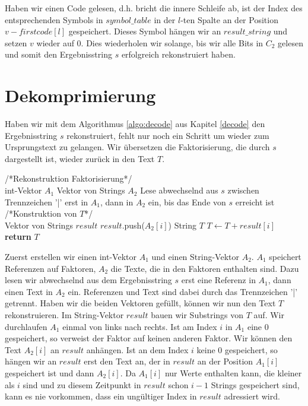 \documentclass[a4paper,11pt]{scrartcl}%
\theoremstyle{change}
\theoremstyle{nonumberplain}
\theoremstyle{change}
\theoremstyle{nonumberplain}
\theoremstyle{change}
\theoremstyle{nonumberplain}
\begin{document}
Haben wir einen Code gelesen, d.h. bricht die innere Schleife ab, ist der Index des entsprechenden Symbols in $symbol\_table$ in der $l$-ten Spalte an der Position $v - firstcode[l]$ gespeichert. Dieses Symbol hängen wir an $result\_string$ und setzen $v$ wieder auf 0. Dies wiederholen wir solange, bis wir alle Bits in $C_2$ gelesen und somit den Ergebnisstring $s$ erfolgreich rekonstruiert haben.


\section{Dekomprimierung}\label{decomp}

Haben wir mit dem Algorithmus \ref{algo:decode} aus Kapitel \ref{decode} den Ergebnisstring $s$ rekonstruiert, fehlt nur noch ein Schritt um wieder zum Ursprungstext zu gelangen. Wir übersetzen die Faktorisierung, die durch $s$ dargestellt ist, wieder zurück in den Text $T$. 

\begin{algorithm}
	/*Rekonstruktion Faktorisierung*/ \\
	int-Vektor $A_1$\;
	Vektor von Strings $A_2$\;
	Lese abwechselnd aus $s$ zwischen Trennzeichen '|' erst in $A_1$, dann in $A_2$ ein, bis das Ende von $s$ erreicht ist\;
	/*Konstruktion von $T$*/ \\
	Vektor von Strings $result$\;
	 {
		 {
			$result$.push($A_2[i]$)\;
		}
	}
	String $T$
	 {
		$T \leftarrow T + result[i]$\;
	}
	\textbf{return} $T$
\end{algorithm}

Zuerst erstellen wir einen int-Vektor $A_1$ und einen String-Vektor $A_2$. $A_1$ speichert Referenzen auf Faktoren, $A_2$ die Texte, die in den Faktoren enthalten sind. 
Dazu lesen wir abwechselnd aus dem Ergebnisstring $s$ erst eine Referenz in $A_1$, dann einen Text in $A_2$ ein. Referenzen und Text sind dabei durch das Trennzeichen '|' getrennt. 
\newline
Haben wir die beiden Vektoren gefüllt, können wir nun den Text $T$ rekonstruieren. Im String-Vektor $result$ bauen wir Substrings von $T$ auf. Wir durchlaufen $A_1$ einmal von links nach rechts. Ist am Index $i$ in $A_1$ eine 0 gespeichert, so verweist der Faktor auf keinen anderen Faktor. Wir können den Text $A_2[i]$ an $result$ anhängen. Ist an dem Index $i$ keine 0 gespeichert, so hängen wir an $result$ erst den Text an, der in $result$ an der Position $A_1[i]$ gespeichert ist und dann $A_2[i]$. Da $A_1[i]$ nur Werte enthalten kann, die kleiner als $i$ sind und zu diesem Zeitpunkt in $result$ schon $i-1$ Strings gespeichert sind, kann es nie vorkommen, dass ein ungültiger Index in $result$ adressiert wird.
\newpage
\end{document}
